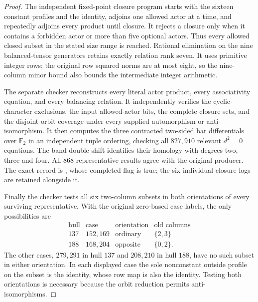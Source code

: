 \begin{proof}
The independent fixed-point closure program
 starts with the sixteen constant
profiles and the identity, adjoins one allowed actor at a time, and
repeatedly adjoins every product until closure.  It rejects a closure
only when it contains a forbidden actor or more than five optional
actors.  Thus every allowed closed subset in the stated size range is
reached.  Rational elimination on the nine balanced-tensor generators
retains exactly relation rank seven.  It uses primitive integer rows;
the original row squared norms are at most eight, so the nine-column
minor bound also bounds the intermediate integer arithmetic.

The separate checker  reconstructs
every literal actor product, every associativity equation, and every
balancing relation.  It independently verifies the cyclic-character
exclusions, the input allowed-actor bits, the complete closure sets,
and the disjoint orbit coverage under every supplied automorphism or
anti-isomorphism.  It then computes the three contracted two-sided
bar differentials over $\mathbb F_2$ in an independent tuple ordering,
checking all $827{,}910$ relevant $d^2=0$ equations.  The band double
shift identifies their homology with degrees two, three and four.
All $868$ representative results agree with the original producer.
The exact record is
, whose completed flag is
true; the six individual closure logs are retained alongside it.

Finally the checker tests all six two-column subsets in both
orientations of every surviving representative.  With the original
zero-based case labels, the only possibilities are
\[
\begin{array}{c|c|c|c}
\text{hull}&\text{case}&\text{orientation}&\text{old columns}\\\hline
137&152,169&\text{ordinary}&\{2,3\}\\
188&168,204&\text{opposite}&\{0,2\}.
\end{array}
\]
The other cases, $279,291$ in hull $137$ and $208,210$ in hull $188$,
have no such subset in either orientation.  In each displayed case
the sole nonconstant outside profile on the subset is the identity,
whose row map is also the identity.  Testing both orientations is
necessary because the orbit reduction permits anti-isomorphisms.
\end{proof}

